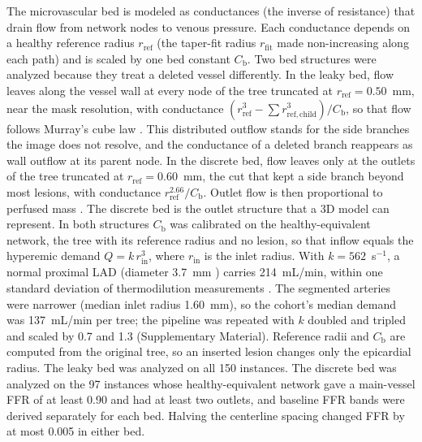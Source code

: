 \documentclass[journal,twoside,web]{ieeecolor}
\begin{document}
The microvascular bed is modeled as conductances (the inverse of resistance) that drain flow from network nodes to
venous pressure. Each conductance depends on a healthy reference radius $r_\mathrm{ref}$ (the taper-fit radius
$r_\mathrm{fit}$ made non-increasing along each path) and is scaled by one bed constant $C_\mathrm{b}$. Two bed structures were analyzed because they treat a deleted vessel differently. In the leaky
bed, flow leaves along the vessel wall at every node of the tree truncated at $r_\mathrm{ref} = 0.50$~mm, near the mask resolution, with
conductance $(r_\mathrm{ref}^3 - \sum r_{\mathrm{ref},\mathrm{child}}^3)/C_\mathrm{b}$, so that flow follows Murray's cube law
\cite{murray1926}. This distributed outflow stands for the side branches the image does not resolve, and the
conductance of a deleted branch reappears as wall outflow at its parent node. In the discrete bed, flow leaves only
at the outlets of the tree truncated at $r_\mathrm{ref} = 0.60$~mm, the cut that kept a side branch beyond most lesions, with conductance $r_\mathrm{ref}^{2.66}/C_\mathrm{b}$.
Outlet flow is then proportional to perfused mass \cite{choy2008}. The discrete bed is the outlet structure that a 3D model can
represent. In both structures $C_\mathrm{b}$ was calibrated on the healthy-equivalent network, the tree with its reference
radius and no lesion, so that inflow equals the hyperemic demand $Q = k\,r_\mathrm{in}^3$, where $r_\mathrm{in}$ is
the inlet radius. With $k = 562$~s$^{-1}$, a normal proximal LAD (diameter 3.7~mm \cite{dodge1992}) carries 214~mL/min, within one standard deviation of thermodilution measurements \cite{fournier2021}. The segmented arteries were narrower (median inlet radius 1.60~mm), so the cohort's median demand was 137~mL/min per tree; the pipeline was repeated with $k$ doubled and tripled and scaled by 0.7 and 1.3 (Supplementary Material). Reference radii and $C_\mathrm{b}$ are computed from the original tree, so an inserted lesion changes
only the epicardial radius. The leaky bed was analyzed on all 150 instances. The discrete bed was analyzed on the
97 instances whose healthy-equivalent network gave a main-vessel FFR of at least 0.90 and had at least two outlets,
and baseline FFR bands were derived separately for each bed. Halving the centerline spacing changed FFR by at most
0.005 in either bed.
\end{document}
